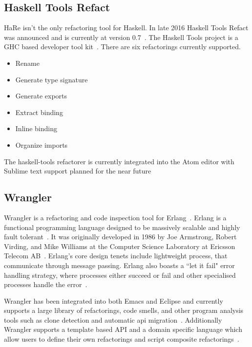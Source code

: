\subsection{Haskell Tools Refact}

HaRe isn't the only refactoring tool for Haskell. In late 2016 Haskell Tools Refact was announced and is currently at version 0.7~\citep{haskellTools}. The Haskell Tools project is a GHC based developer tool kit~\citep{haskellToolsGit}. There are six refactorings currently supported.

\begin{itemize}
\item Rename
\item Generate type signature
\item Generate exports
\item Extract binding
\item Inline binding
\item Organize imports
\end{itemize}

The haskell-tools refactorer is currently integrated into the Atom editor with Sublime text support planned for the near future~\citep{haskellTools}

\subsection{Wrangler}

Wrangler is a refactoring and code inspection tool for Erlang~\citep{wrangler}. Erlang is a functional programming language designed to be massively scalable and highly fault tolerant~\cite{erlang}. It was originally developed in 1986 by Joe Armstrong, Robert Virding, and Mike Williams at the Computer Science Laboratory at Ericsson Telecom AB~\cite{erlangHistory}. Erlang's core design tenets include lightweight process, that communicate through message passing. Erlang also boasts a ``let it fail" error handling strategy, where processes either succeed or fail and other specialised processes handle the error~\cite{armstrongThesis}.

Wrangler has been integrated into both Emacs and Eclipse and currently supports a large library of refactorings, code smells, and other program analysis tools such as clone detection and automatic api migration~\citep{wrangler}. Additionally Wrangler supports a template based API and a domain specific language which allow users to define their own refactorings and script composite refactorings~\citep{wranglerDomain}.

